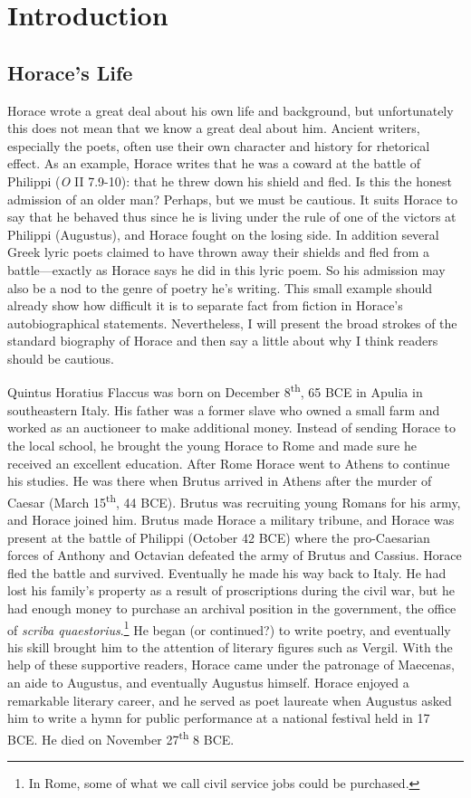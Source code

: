\chapter*{Introduction}

\section*{Horace's Life}

Horace wrote a great deal about his own life and background, but unfortunately this does not mean that we know a great deal about him.  Ancient writers, especially the poets, often use their own character and history for rhetorical effect.  As an example, Horace writes that he was a coward at the battle of Philippi (\textit{O} II 7.9-10): that he threw down his shield and fled. Is this the honest admission of an older man? Perhaps, but we must be cautious.  It suits Horace to say that he behaved thus since he is living under the rule of one of the victors at Philippi (Augustus), and Horace fought on the losing side.  In addition several Greek lyric poets claimed to have thrown away their shields and fled from a battle---exactly as Horace says he did in this lyric poem.  So his admission may also be a nod to the genre of poetry he's writing.  This small example should already show how difficult it is to separate fact from fiction in Horace's autobiographical statements.  Nevertheless, I will present the broad strokes of the standard biography of Horace and then say a little about why I think readers should be cautious.

Quintus Horatius Flaccus was born on December 8\textsuperscript{th}, 65 BCE in Apulia in southeastern Italy.  His father was a former slave who owned a small farm and worked as an auctioneer to make additional money.  Instead of sending Horace to the local school, he brought the young Horace to Rome and made sure he received an excellent education.  After Rome Horace went to Athens to continue his studies.  He was there when Brutus arrived in Athens after the murder of Caesar (March 15\textsuperscript{th}, 44 BCE).  Brutus was recruiting young Romans for his army, and Horace joined him.  Brutus made Horace a military tribune, and Horace was present at the battle of Philippi (October 42 BCE) where the pro-Caesarian forces of Anthony and Octavian defeated the army of Brutus and Cassius.  Horace fled the battle and survived.  Eventually he made his way back to Italy.  He had lost his family's property as a result of proscriptions during the civil war, but he had enough money to purchase an archival position in the government, the office of \textit{scriba quaestorius}.\footnote{In Rome, some of what we call civil service jobs could be purchased.}  He began (or continued?) to write poetry, and eventually his skill brought him to the attention of literary figures such as Vergil.  With the help of these supportive readers, Horace came under the patronage of Maecenas, an aide to Augustus, and eventually Augustus himself.  Horace enjoyed a remarkable literary career, and he served as poet laureate when Augustus asked him to write a hymn for public performance at a national festival held in 17 BCE.  He died on November 27\textsuperscript{th} 8 BCE.

